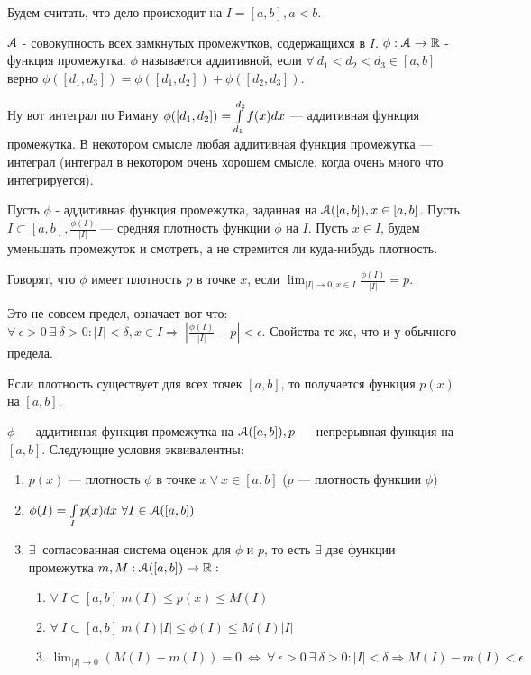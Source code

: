 \documentclass[12pt]{report}
\begin{document}
Будем считать, что дело происходит на $I = [a, b], a < b$.

\begin{defn}
$\EuScript A$ - совокупность всех замкнутых промежутков, содержащихся в $I$. $\phi: \EuScript A \to \mathbb{R}$ - функция промежутка. $\phi$ называется аддитивной, если $\forall ~d_1 < d_2 < d_3 \in [a, b] $ верно $\phi([d_1, d_3]) = \phi([d_1, d_2]) + \phi([d_2, d_3])$.
\end{defn}

\begin{rem}
Ну вот интеграл по Риману $\phi([d_1, d_2]) = \int\limits_{d_1}^{d_2}{f(x)dx}$ --- аддитивная функция промежутка. В некотором смысле любая аддитивная функция промежутка --- интеграл (интеграл в некотором очень хорошем смысле, когда очень много что интегрируется).
\end{rem}

\begin{defn}
Пусть $\phi$ - аддитивная функция промежутка, заданная на $\EuScript A([a, b]), x \in [a, b]$. Пусть $I \subset [a, b], \frac{\phi(I)}{|I|}$ --- средняя плотность функции $\phi$ на $I$. Пусть $x \in I$, будем уменьшать промежуток и смотреть, а не стремится ли куда-нибудь плотность.

Говорят, что $\phi$ имеет плотность $p$ в точке $x$, если $\lim_{|I| \to 0, x \in I}{\frac{\phi(I)}{|I|}} = p$. 

Это не совсем предел, означает вот что: $\forall ~\epsilon > 0 ~\exists ~\delta > 0: |I| < \delta, x \in I \Rightarrow ~\left|\frac{\phi(I)}{|I|} - p\right| < \epsilon$. Свойства те же, что и у обычного предела.

Если плотность существует для всех точек $[a, b]$, то получается функция $p(x)$ на $[a, b]$.
\end{defn}

\begin{thm}
$\phi$ --- аддитивная функция промежутка на $\EuScript A([a, b]), p$ --- непрерывная функция на $[a, b]$. Следующие условия эквивалентны:
\begin{enumerate}
\item $p(x)$ --- плотность $\phi$ в точке $x ~\forall ~x \in [a, b]$ ($p$ --- плотность функции $\phi$)
\item $\phi(I) = \int\limits_I{p(x)dx} ~\forall I \in \EuScript A([a, b])$
\item $\exists ~$ согласованная система оценок для $\phi$ и $p$, то есть $\exists $ две функции промежутка $m, M: \EuScript A([a, b]) \to \mathbb{R}: $
\begin{enumerate}
\item $\forall ~I \subset [a, b] ~m(I) \le p(x) \le M(I)$
\item $\forall ~I \subset [a, b] ~m(I)|I| \le \phi(I) \le M(I)|I|$
\item $\lim_{|I| \to 0}{(M(I) - m(I))} = 0 ~\Leftrightarrow ~\forall ~\epsilon > 0 ~\exists ~\delta > 0: |I| < \delta \Rightarrow M(I) - m(I) < \epsilon$
\end{enumerate}
\end{enumerate}
\end{thm}
\end{document}

